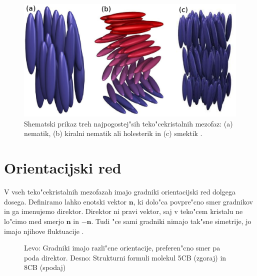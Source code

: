 \documentclass[12pt,twoside,openright,final,a4paper]{report}
\begin{document}
\begin{figure}[h]
\centering
  \includegraphics[width=.8\textwidth]{faze}
 \caption{Shematski prikaz treh najpogostej"sih teko"cekristalnih mezofaz: (a) nematik, (b) kiralni nematik ali holesterik in (c) smektik \cite{barrett:lc}.}
  \label{fig:faze}
\end{figure}

\section{Orientacijski red}

V vseh teko"cekristalnih mezofazah imajo gradniki orientacijski red dolgega dosega. 
Definiramo lahko enotski vektor $\mathbf{n}$, ki dolo"ca povpre"cno smer gradnikov in ga imenujemo direktor. 
Direktor ni pravi vektor, saj v teko"cem kristalu ne lo"cimo med smerjo $\mathbf{n}$ in $\mathbf{-n}$. 
Tudi "ce sami gradniki nimajo tak"sne simetrije, jo imajo njihove fluktuacije \cite{mermin}. 

\begin{figure}[h]
\begin{center}
 \caption{Levo: Gradniki imajo razli"cne orientacije, preferen"cno smer pa poda direktor. Desno: Strukturni formuli molekul 5CB (zgoraj) in 8CB (spodaj) \cite{wiki:lc}}
 \label{fig:nematik-direktor}
 \end{center}
\end{figure}
\end{document}
